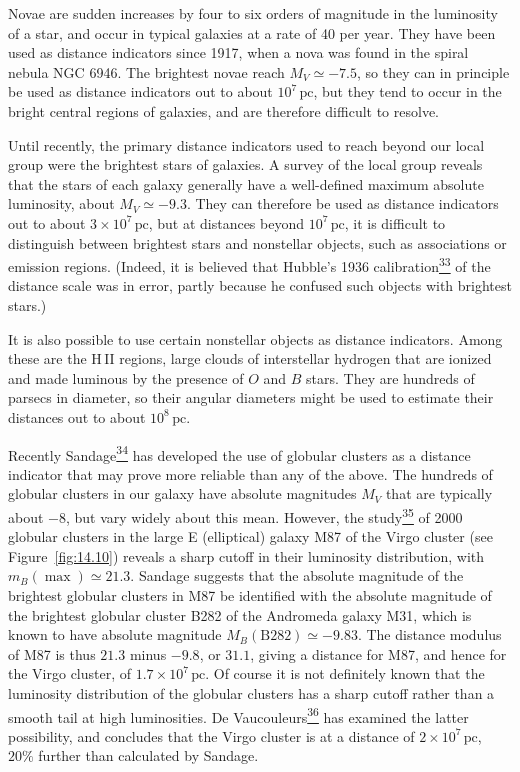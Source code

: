 Novae are sudden increases by four to six orders of magnitude in the
luminosity of a star, and occur in typical galaxies at a rate of 40 per
year. They have been used as distance indicators since 1917, when a nova was
found in the spiral nebula NGC 6946. The brightest novae reach
\(M_V\simeq-7.5\), so they can in principle be used as distance indicators
out to about \(10^7\,\mathrm{pc}\), but they tend to occur in the bright
central regions of galaxies, and are therefore difficult to resolve.

Until recently, the primary distance indicators used to reach beyond our
local group were the brightest stars of galaxies. A survey of the local
group reveals that the stars of each galaxy generally have a well-defined
maximum absolute luminosity, about \(M_V\simeq-9.3\). They can therefore be
used as distance indicators out to about \(3\times10^7\,\mathrm{pc}\), but
at distances beyond \(10^7\,\mathrm{pc}\), it is difficult to distinguish
between brightest stars and nonstellar objects, such as associations or
emission regions. (Indeed, it is believed that Hubble's 1936
calibration\hyperref[ch14-ref-33]{\textsuperscript{33}} of the distance scale
was in error, partly because he confused such objects with brightest stars.)

It is also possible to use certain nonstellar objects as distance
indicators. Among these are the H\,II regions, large clouds of interstellar
hydrogen that are ionized and made luminous by the presence of \(O\) and
\(B\) stars. They are hundreds of parsecs in diameter, so their angular
diameters might be used to estimate their distances out to about
\(10^8\,\mathrm{pc}\).

Recently Sandage\hyperref[ch14-ref-34]{\textsuperscript{34}} has developed
the use of globular clusters as a distance indicator that may prove more
reliable than any of the above. The hundreds of globular clusters in our
galaxy have absolute magnitudes \(M_V\) that are typically about \(-8\), but
vary widely about this mean. However, the
study\hyperref[ch14-ref-35]{\textsuperscript{35}} of 2000 globular clusters
in the large E (elliptical) galaxy M87 of the Virgo cluster (see
Figure~\ref{fig:14.10}) reveals a sharp cutoff in their luminosity
distribution, with \(m_B(\max)\simeq21.3\). Sandage suggests that the
absolute magnitude of the brightest globular clusters in M87 be identified
with the absolute magnitude of the brightest globular cluster B282 of the
Andromeda galaxy M31, which is known to have absolute magnitude
\(M_B(\mathrm{B282})\simeq-9.83\). The distance modulus of M87 is thus
\(21.3\) minus \(-9.8\), or \(31.1\), giving a distance for M87, and hence
for the Virgo cluster, of \(1.7\times10^7\,\mathrm{pc}\). Of course it is
not definitely known that the luminosity distribution of the globular
clusters has a sharp cutoff rather than a smooth tail at high luminosities.
De Vaucouleurs\hyperref[ch14-ref-36]{\textsuperscript{36}} has examined the
latter possibility, and concludes that the Virgo cluster is at a distance
of \(2\times10^7\,\mathrm{pc}\), \(20\%\) further than calculated by
Sandage.

